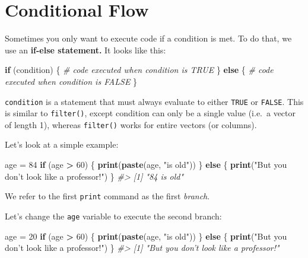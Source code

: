 \documentclass[]{book}
\newenvironment{Shaded}{\begin{snugshade}}{\end{snugshade}}
\newcommand{\KeywordTok}[1]{\textcolor[rgb]{0.13,0.29,0.53}{\textbf{#1}}}
\newcommand{\DecValTok}[1]{\textcolor[rgb]{0.00,0.00,0.81}{#1}}
\newcommand{\StringTok}[1]{\textcolor[rgb]{0.31,0.60,0.02}{#1}}
\newcommand{\CommentTok}[1]{\textcolor[rgb]{0.56,0.35,0.01}{\textit{#1}}}
\newcommand{\ControlFlowTok}[1]{\textcolor[rgb]{0.13,0.29,0.53}{\textbf{#1}}}
\newcommand{\OperatorTok}[1]{\textcolor[rgb]{0.81,0.36,0.00}{\textbf{#1}}}
\newcommand{\NormalTok}[1]{#1}
\begin{document}
\hypertarget{conditional-flow}{\section{Conditional
Flow}\label{conditional-flow}}

Sometimes you only want to execute code if a condition is met. To do
that, we use an \textbf{if-else statement.} It looks like this:

\begin{Shaded}
\begin{Highlighting}[]
\ControlFlowTok{if}\NormalTok{ (condition) \{}
  \CommentTok{# code executed when condition is TRUE}
\NormalTok{\} }\ControlFlowTok{else}\NormalTok{ \{}
  \CommentTok{# code executed when condition is FALSE}
\NormalTok{\}}
\end{Highlighting}
\end{Shaded}

\texttt{condition} is a statement that must always evaluate to either
\texttt{TRUE} or \texttt{FALSE}. This is similar to \texttt{filter()},
except condition can only be a single value (i.e.~a vector of length 1),
whereas \texttt{filter()} works for entire vectors (or columns).

Let's look at a simple example:

\begin{Shaded}
\begin{Highlighting}[]
\NormalTok{age =}\StringTok{ }\DecValTok{84}
\ControlFlowTok{if}\NormalTok{ (age }\OperatorTok{>}\StringTok{ }\DecValTok{60}\NormalTok{) \{}
    \KeywordTok{print}\NormalTok{(}\KeywordTok{paste}\NormalTok{(age, }\StringTok{"is old"}\NormalTok{))}
\NormalTok{\} }\ControlFlowTok{else}\NormalTok{ \{}
    \KeywordTok{print}\NormalTok{(}\StringTok{"But you don't look like a professor!"}\NormalTok{)}
\NormalTok{\}}
\CommentTok{#> [1] "84 is old"}
\end{Highlighting}
\end{Shaded}

We refer to the first \texttt{print} command as the first \emph{branch}.

Let's change the \texttt{age} variable to execute the second branch:

\begin{Shaded}
\begin{Highlighting}[]
\NormalTok{age =}\StringTok{ }\DecValTok{20}
\ControlFlowTok{if}\NormalTok{ (age }\OperatorTok{>}\StringTok{ }\DecValTok{60}\NormalTok{) \{}
    \KeywordTok{print}\NormalTok{(}\KeywordTok{paste}\NormalTok{(age, }\StringTok{"is old"}\NormalTok{))}
\NormalTok{\} }\ControlFlowTok{else}\NormalTok{ \{}
    \KeywordTok{print}\NormalTok{(}\StringTok{"But you don't look like a professor!"}\NormalTok{)}
\NormalTok{\}}
\CommentTok{#> [1] "But you don't look like a professor!"}
\end{Highlighting}
\end{Shaded}
\end{document}
